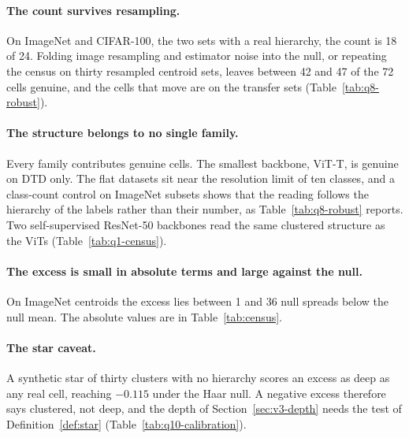 \documentclass{article}
\theoremstyle{definition}
\theoremstyle{plain}
\theoremstyle{remark}
\begin{document}
\paragraph{The count survives resampling.} On ImageNet and CIFAR-100, the two sets with a real hierarchy, the count is 18 of 24. Folding image resampling and estimator noise into the null, or repeating the census on thirty resampled centroid sets, leaves between 42 and 47 of the 72 cells genuine, and the cells that move are on the transfer sets (Table~\ref{tab:q8-robust}). %

\paragraph{The structure belongs to no single family.} Every family contributes genuine cells. The smallest backbone, ViT-T, is genuine on DTD only. The flat datasets sit near the resolution limit of ten classes, and a class-count control on ImageNet subsets shows that the reading follows the hierarchy of the labels rather than their number, as Table~\ref{tab:q8-robust} reports. Two self-supervised ResNet-50 backbones read the same clustered structure as the ViTs (Table~\ref{tab:q1-census}). %

\paragraph{The excess is small in absolute terms and large against the null.} On ImageNet centroids the excess lies between 1 and 36 null spreads below the null mean. The absolute values are in Table~\ref{tab:census}. %

\paragraph{The star caveat.} A synthetic star of thirty clusters with no hierarchy scores an excess as deep as any real cell, reaching $-0.115$ under the Haar null. A negative excess therefore says clustered, not deep, and the depth of Section~\ref{sec:v3-depth} needs the test of Definition~\ref{def:star} (Table~\ref{tab:q10-calibration}). %
\end{document}
